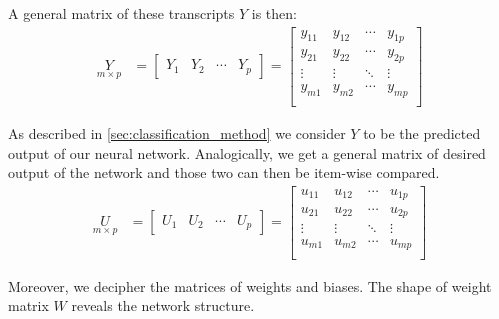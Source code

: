 A general matrix of these transcripts $ Y $ is then:
\begin{align*}
\underset{m\times p}{Y} &= 
\begin{bmatrix}
    Y_1 & Y_2 & \cdots & Y_p
\end{bmatrix} =
\begin{bmatrix}
    y_{11} & y_{12} & \cdots & y_{1p} \\
    y_{21} & y_{22} & \cdots & y_{2p} \\
    \vdots & \vdots & \ddots & \vdots \\
    y_{m1} & y_{m2} & \cdots & y_{mp} \\      
\end{bmatrix}
\end{align*}

As described in \cref{sec:classification_method} we consider $ Y $ to be the predicted output of our neural network. Analogically, we get a general matrix of desired output of the network and those two can then be item-wise compared.
\begin{align*}
\underset{m\times p}{U} &= 
\begin{bmatrix}
    U_1 & U_2 & \cdots & U_p
\end{bmatrix} =
\begin{bmatrix}
    u_{11} & u_{12} & \cdots & u_{1p} \\
    u_{21} & u_{22} & \cdots & u_{2p} \\
    \vdots & \vdots & \ddots & \vdots \\
    u_{m1} & u_{m2} & \cdots & u_{mp} \\      
\end{bmatrix}
\end{align*}

Moreover, we decipher the matrices of weights and biases. The shape of weight matrix $ W $ reveals the network structure.